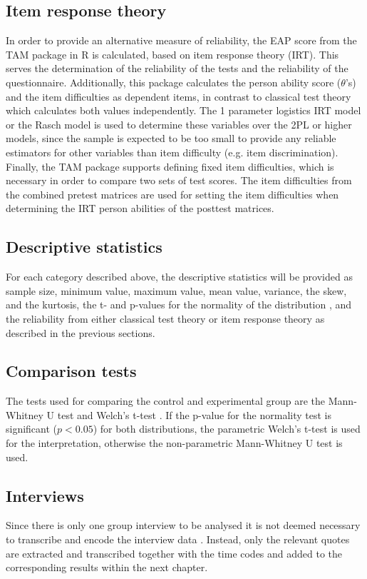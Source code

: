 \subsection{Item response theory}

In order to provide an alternative measure of reliability, the EAP score from the TAM package in R \cite{tamr} is calculated, based on item response theory (IRT). This serves the determination of the reliability of the tests and the reliability of the questionnaire. Additionally, this package calculates the person ability score ($\theta$'s) and the item difficulties as dependent items, in contrast to classical test theory which calculates both values independently. The 1 parameter logistics IRT model or the Rasch model is used to determine these variables over the 2PL or higher models, since the sample is expected to be too small to provide any reliable estimators for other variables than item difficulty (e.g. item discrimination). Finally, the TAM package supports defining fixed item difficulties, which is necessary in order to compare two sets of test scores. The item difficulties from the combined pretest matrices are used for setting the item difficulties when determining the IRT person abilities of the posttest matrices.

\subsection{Descriptive statistics}

For each category described above, the descriptive statistics will be provided as sample size, minimum value, maximum value, mean value, variance, the skew, and the kurtosis, the t- and p-values for the normality of the distribution \cite{normality}, and the reliability from either classical test theory or item response theory as described in the previous sections.

\subsection{Comparison tests}

The tests used for comparing the control and experimental group are the Mann-Whitney U \cite{mannwhitneyu} test and Welch's t-test \cite{welch}. If the p-value for the normality test is significant ($p<0.05$) for both distributions, the parametric Welch's t-test is used for the interpretation, otherwise the non-parametric Mann-Whitney U test is used.

\subsection{Interviews}

Since there is only one group interview to be analysed it is not deemed necessary to transcribe and encode the interview data \cite{baarda}. Instead, only the relevant quotes are extracted and transcribed together with the time codes and added to the corresponding results within the next chapter.
